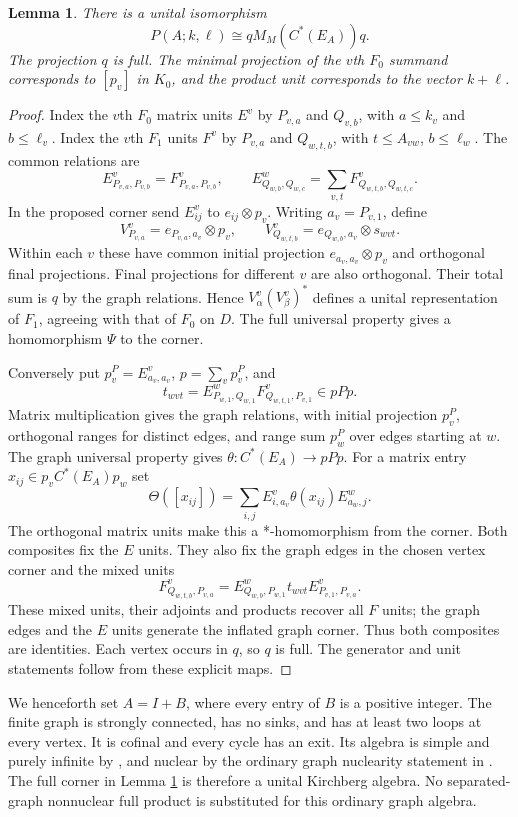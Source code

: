 \documentclass[11pt,letterpaper]{amsart}
\newtheorem{lemma}[theorem]{Lemma}
\theoremstyle{remark}\newtheorem{remark}[theorem]{Remark}
\begin{document}
\begin{lemma}\label{lem:graph}
There is a unital isomorphism
\[
                  P(A;k,\ell)\cong qM_M(C^*(E_A))q.
\]
The projection $q$ is full. The minimal projection of the $v$th
$F_0$ summand corresponds to $[p_v]$ in $K_0$, and the product unit
corresponds to the vector $k+\ell$.
\end{lemma}
\begin{proof}
Index the $v$th $F_0$ matrix units $E^v$ by $P_{v,a}$ and $Q_{v,b}$,
with $a\le k_v$ and $b\le\ell_v$. Index the $v$th $F_1$ units $F^v$
by $P_{v,a}$ and $Q_{w,t,b}$, with $t\le A_{vw}$, $b\le\ell_w$.
The common relations are
\[
 E^v_{P_{v,a},P_{v,b}}=F^v_{P_{v,a},P_{v,b}},\qquad
 E^w_{Q_{w,b},Q_{w,c}}=\sum_{v,t}F^v_{Q_{w,t,b},Q_{w,t,c}}.
\]
In the proposed corner send $E^v_{ij}$ to $e_{ij}\otimes p_v$.
Writing $a_v=P_{v,1}$, define
\[
 V^v_{P_{v,a}}=e_{P_{v,a},a_v}\otimes p_v,\qquad
 V^v_{Q_{w,t,b}}=e_{Q_{w,b},a_v}\otimes s_{wvt}.
\]
Within each $v$ these have common initial projection
$e_{a_v,a_v}\otimes p_v$ and orthogonal final projections. Final
projections for different $v$ are also orthogonal. Their total sum is
$q$ by the graph relations. Hence $V^v_\alpha(V^v_\beta)^*$ defines
a unital representation of $F_1$, agreeing with that of $F_0$ on $D$.
The full universal property gives a homomorphism $\Psi$ to the corner.

Conversely put $p_v^P=E^v_{a_v,a_v}$, $p=\sum_vp_v^P$, and
\[
 t_{wvt}=E^w_{P_{w,1},Q_{w,1}}F^v_{Q_{w,t,1},P_{v,1}}\in pPp.
\]
Matrix multiplication gives the graph relations, with initial projection
$p_v^P$, orthogonal ranges for distinct edges, and range sum $p_w^P$
over edges starting at $w$. The graph universal property
\cite[Theorem 1.2]{KPR} gives $\theta:C^*(E_A)\to pPp$.
For a matrix entry $x_{ij}\in p_vC^*(E_A)p_w$ set
\[
 \Theta([x_{ij}])=\sum_{i,j}E^v_{i,a_v}\theta(x_{ij})E^w_{a_w,j}.
\]
The orthogonal matrix units make this a *-homomorphism from the corner.
Both composites fix the $E$ units. They also fix the graph edges in the
chosen vertex corner and the mixed units
\[
 F^v_{Q_{w,t,b},P_{v,a}}
       =E^w_{Q_{w,b},P_{w,1}}t_{wvt}E^v_{P_{v,1},P_{v,a}}.
\]
These mixed units, their adjoints and products recover all $F$ units;
the graph edges and the $E$ units generate the inflated graph corner.
Thus both composites are identities. Each vertex occurs in $q$, so $q$
is full. The generator and unit statements follow from these explicit maps.
\end{proof}

We henceforth set $A=I+B$, where every entry of $B$ is a positive integer.
The finite graph is strongly connected, has no sinks, and has at least
two loops at every vertex. It is cofinal and every cycle has an exit.
Its algebra is simple and purely infinite by \cite[Corollary 3.11]{KPR},
and nuclear by the ordinary graph nuclearity statement in
\cite[Remark 3.10]{AG}. The full corner in Lemma \ref{lem:graph} is
therefore a unital Kirchberg algebra. No separated-graph nonnuclear
full product is substituted for this ordinary graph algebra.
\end{document}
